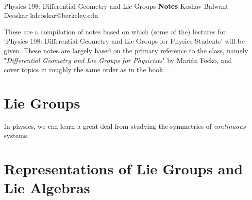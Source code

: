 \documentclass[11pt]{article}
\begin{document}
\thispagestyle{empty}
\bigskip \
\vspace{0.1cm}

\begin{center}
{\fontsize{22}{22} \selectfont Physics 198: Differential Geometry and Lie Groups}
\vskip 16pt
{\fontsize{36}{36} \selectfont \bf \sffamily Notes}
\vskip 24pt
{\fontsize{18}{18} \selectfont \rmfamily Keshav Balwant Deoskar} 
\vskip 6pt
{\fontsize{14}{14} \selectfont \ttfamily kdeoskar@berkeley.edu} 
\vskip 24pt
\end{center}



These are a compilation of notes based on which (some of the) lectures for 'Physics 198: Differential Geometry and Lie Groups for Physics Students' will be given. These notes are largely based on the primary reference to the class, namely "\textit{Differential Geometry and Lie Groups for Physicists}" by Marián Fecko, and cover topics in roughly the same order as in the book.


\tableofcontents 


\newpage
\section{Lie Groups}

\vskip 0.5cm
In physics, we can learn a great deal from studying the symmetries of \emph{continuous} systems. 


\newpage
\section{Representations of Lie Groups and Lie Algebras}
\end{document}
